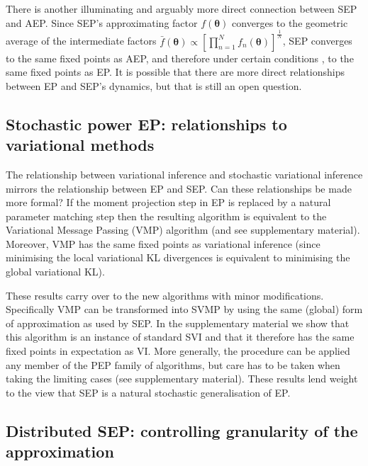 There is another illuminating and arguably more direct connection between SEP and AEP. Since SEP's approximating factor $f(\bm{\theta})$ converges to the geometric average of the intermediate factors $\bar{f}(\bm{\theta}) \propto [\prod_{n=1}^N f_n(\bm{\theta})]^{\frac{1}{N}}$, SEP converges to the same fixed points as AEP, and therefore under certain conditions \cite{barthelme:aep}, to the same fixed points as EP. 
%
It is possible that there are more direct relationships between EP and SEP's dynamics, but that is still an open question.



\subsection{Stochastic power EP: relationships to variational methods}
%
The relationship between variational inference and stochastic variational inference \cite{hoffman:svi} mirrors the relationship between EP and SEP. 
%
Can these relationships be made more formal? If the moment projection step in EP is replaced by a natural parameter matching step then the resulting algorithm is equivalent to the Variational Message Passing (VMP) algorithm \cite{minka:divergence} (and see supplementary material). Moreover, VMP has the same fixed points as variational inference \cite{winn:vmp} (since minimising the local variational KL divergences is equivalent to minimising the global variational KL). 


These results carry over to the new algorithms with minor modifications. Specifically VMP can be transformed into SVMP by using the same (global) form of approximation as used by SEP. In the supplementary material we show that this algorithm is an instance of standard SVI and that it therefore has the same fixed points in expectation as VI. 
%
More generally, the procedure can be applied any member of the PEP family of algorithms, but care has to be taken when taking the limiting cases (see supplementary material).
%
These results lend weight to the view that SEP is a natural stochastic generalisation of EP.


\subsection{Distributed SEP: controlling granularity of the approximation}

